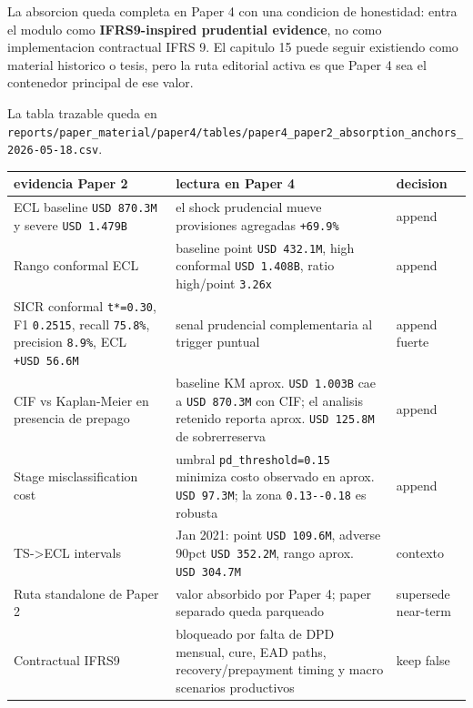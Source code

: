 \documentclass[
  spanish,
  11pt,
  letterpaper,
]{scrbook}
\newcounter{none} %
\theoremstyle{plain}
\theoremstyle{remark}
\begin{document}
La absorcion queda completa en Paper 4 con una condicion de honestidad:
entra el modulo como \textbf{IFRS9-inspired prudential evidence}, no
como implementacion contractual IFRS 9. El capitulo 15 puede seguir
existiendo como material historico o tesis, pero la ruta editorial
activa es que Paper 4 sea el contenedor principal de ese valor.

La tabla trazable queda en
\texttt{reports/paper\_material/paper4/tables/paper4\_paper2\_absorption\_anchors\_2026-05-18.csv}.

{\def\LTcaptype{none} %
\begin{longtable}[]{@{}
  >{\raggedright\arraybackslash}p{}
  >{\raggedright\arraybackslash}p{}
  >{\raggedright\arraybackslash}p{}@{}}
\toprule\noalign{}
\begin{minipage}[b]{\linewidth}\raggedright
evidencia Paper 2
\end{minipage} & \begin{minipage}[b]{\linewidth}\raggedright
lectura en Paper 4
\end{minipage} & \begin{minipage}[b]{\linewidth}\raggedright
decision
\end{minipage} \\
\midrule\noalign{}
\endhead
\bottomrule\noalign{}
\endlastfoot
ECL baseline \texttt{USD\ 870.3M} y severe \texttt{USD\ 1.479B} & el
shock prudencial mueve provisiones agregadas \texttt{+69.9\%} &
append \\
Rango conformal ECL & baseline point \texttt{USD\ 432.1M}, high
conformal \texttt{USD\ 1.408B}, ratio high/point \texttt{3.26x} &
append \\
SICR conformal \texttt{t*=0.30}, F1 \texttt{0.2515}, recall
\texttt{75.8\%}, precision \texttt{8.9\%}, ECL \texttt{+USD\ 56.6M} &
senal prudencial complementaria al trigger puntual & append fuerte \\
CIF vs Kaplan-Meier en presencia de prepago & baseline KM aprox.
\texttt{USD\ 1.003B} cae a \texttt{USD\ 870.3M} con CIF; el analisis
retenido reporta aprox. \texttt{USD\ 125.8M} de sobrerreserva &
append \\
Stage misclassification cost & umbral \texttt{pd\_threshold=0.15}
minimiza costo observado en aprox. \texttt{USD\ 97.3M}; la zona
\texttt{0.13-\/-0.18} es robusta & append \\
TS-\textgreater ECL intervals & Jan 2021: point \texttt{USD\ 109.6M},
adverse 90pct \texttt{USD\ 352.2M}, rango aprox. \texttt{USD\ 304.7M} &
contexto \\
Ruta standalone de Paper 2 & valor absorbido por Paper 4; paper separado
queda parqueado & supersede near-term \\
Contractual IFRS9 & bloqueado por falta de DPD mensual, cure, EAD paths,
recovery/prepayment timing y macro scenarios productivos & keep false \\
\end{longtable}
}
\end{document}
